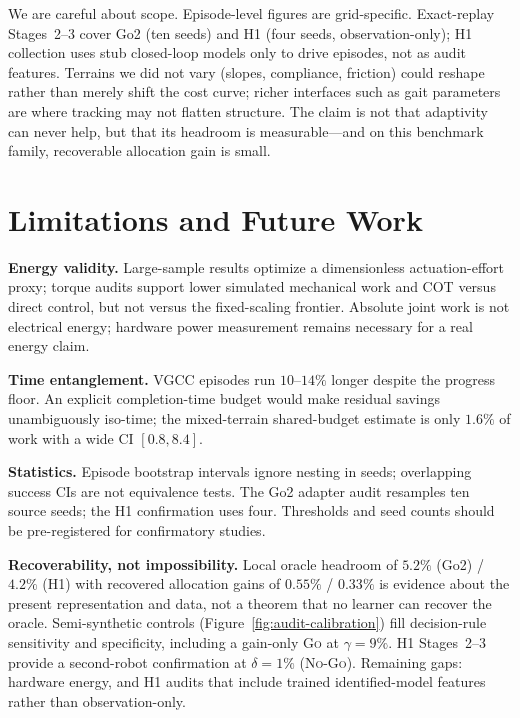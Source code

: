 \documentclass{article}
\begin{document}
We are careful about scope. Episode-level figures are grid-specific. Exact-replay
Stages~2--3 cover Go2 (ten seeds) and H1 (four seeds, observation-only); H1
collection uses stub closed-loop models only to drive episodes, not as audit
features. Terrains we did not vary (slopes, compliance, friction) could reshape
rather than merely shift the cost curve; richer interfaces such as gait
parameters~\citep{margolis2022walk} are where tracking may not flatten structure.
The claim is not that adaptivity can never help, but that its headroom is
measurable---and on this benchmark family, recoverable allocation gain is small.

\section{Limitations and Future Work}
\label{sec:limitations}

\textbf{Energy validity.}
Large-sample results optimize a dimensionless actuation-effort proxy; torque
audits support lower simulated mechanical work and COT versus direct control, but
not versus the fixed-scaling frontier. Absolute joint work is not electrical
energy; hardware power measurement remains necessary for a real energy claim.

\textbf{Time entanglement.}
VGCC episodes run $10$--$14\%$ longer despite the progress floor. An explicit
completion-time budget would make residual savings unambiguously iso-time; the
mixed-terrain shared-budget estimate is only $1.6\%$ of work with a wide CI
$[0.8, 8.4]$.

\textbf{Statistics.}
Episode bootstrap intervals ignore nesting in seeds; overlapping success CIs are
not equivalence tests. The Go2 adapter audit resamples ten source seeds; the H1
confirmation uses four. Thresholds and seed counts should be pre-registered for
confirmatory studies.

\textbf{Recoverability, not impossibility.}
Local oracle headroom of $5.2\%$ (Go2) / $4.2\%$ (H1) with recovered allocation
gains of $0.55\%$ / $0.33\%$ is evidence about the present representation and
data, not a theorem that no learner can recover the oracle. Semi-synthetic
controls (Figure~\ref{fig:audit-calibration}) fill decision-rule sensitivity and
specificity, including a gain-only \textsc{Go} at $\gamma=9\%$. H1 Stages~2--3
provide a second-robot confirmation at $\delta=1\%$ (\textsc{No-Go}). Remaining
gaps: hardware energy, and H1 audits that include trained identified-model
features rather than observation-only.
\end{document}
